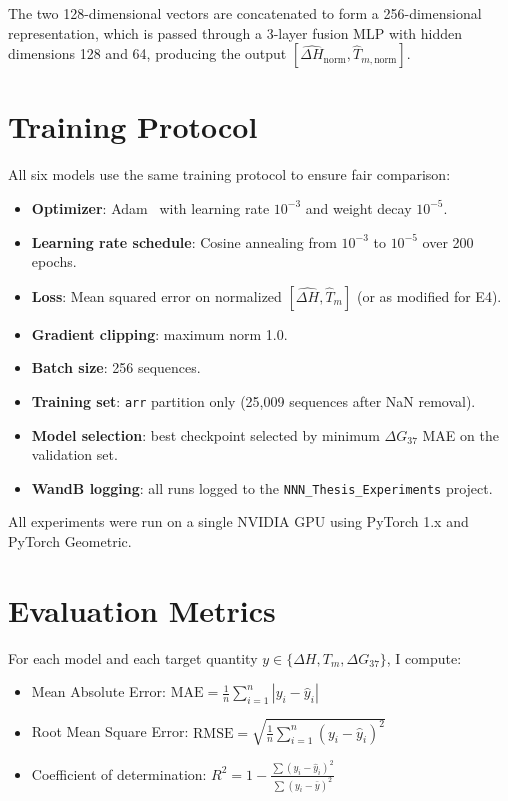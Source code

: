 \documentclass[12pt,oneside,letterpaper]{report}
\begin{document}
The two 128-dimensional vectors are concatenated to form a 256-dimensional representation, which is passed through a 3-layer fusion MLP with hidden dimensions 128 and 64, producing the output $[\hat{\Delta H}_{\text{norm}}, \hat{T}_{m,\text{norm}}]$.

\section{Training Protocol}

All six models use the same training protocol to ensure fair comparison:

\begin{itemize}
    \item \textbf{Optimizer}: Adam~\cite{kingma2015} with learning rate $10^{-3}$ and weight decay $10^{-5}$.
    \item \textbf{Learning rate schedule}: Cosine annealing from $10^{-3}$ to $10^{-5}$ over 200 epochs.
    \item \textbf{Loss}: Mean squared error on normalized $[\hat{\Delta H}, \hat{T}_m]$ (or as modified for E4).
    \item \textbf{Gradient clipping}: maximum norm 1.0.
    \item \textbf{Batch size}: 256 sequences.
    \item \textbf{Training set}: \texttt{arr} partition only (25,009 sequences after NaN removal).
    \item \textbf{Model selection}: best checkpoint selected by minimum $\Delta G_{37}$ MAE on the validation set.
    \item \textbf{WandB logging}: all runs logged to the \texttt{NNN\_Thesis\_Experiments} project.
\end{itemize}

All experiments were run on a single NVIDIA GPU using PyTorch 1.x and PyTorch Geometric.

\section{Evaluation Metrics}

For each model and each target quantity $y \in \{\Delta H, T_m, \Delta G_{37}\}$, I compute:

\begin{itemize}
    \item Mean Absolute Error: $\text{MAE} = \frac{1}{n}\sum_{i=1}^n |y_i - \hat{y}_i|$
    \item Root Mean Square Error: $\text{RMSE} = \sqrt{\frac{1}{n}\sum_{i=1}^n (y_i - \hat{y}_i)^2}$
    \item Coefficient of determination: $R^2 = 1 - \frac{\sum(y_i - \hat{y}_i)^2}{\sum(y_i - \bar{y})^2}$
\end{itemize}
\end{document}
